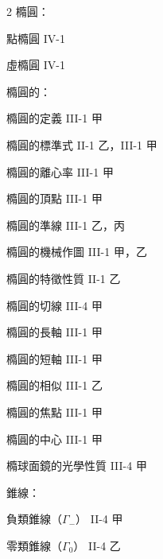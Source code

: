 \begin{multicols}{2}
\noindent 橢圓：\par
\noindent\hspace*{1.5em} 點橢圓 \hfill IV-1\par
\noindent\hspace*{1.5em} 虛橢圓 \hfill IV-1\par
\noindent 橢圓的：\par
\noindent\hspace*{1.5em} 橢圓的定義 \hfill III-1 甲\par
\noindent\hspace*{1.5em} 橢圓的標準式 \hfill II-1 乙，III-1 甲\par
\noindent\hspace*{1.5em} 橢圓的離心率 \hfill III-1 甲\par
\noindent\hspace*{1.5em} 橢圓的頂點 \hfill III-1 甲\par
\noindent\hspace*{1.5em} 橢圓的準線 \hfill III-1 乙，丙\par
\noindent\hspace*{1.5em} 橢圓的機械作圖 \hfill III-1 甲，乙\par
\noindent\hspace*{1.5em} 橢圓的特徵性質 \hfill II-1 乙\par
\noindent\hspace*{1.5em} 橢圓的切線 \hfill III-4 甲\par
\noindent\hspace*{1.5em} 橢圓的長軸 \hfill III-1 甲\par
\noindent\hspace*{1.5em} 橢圓的短軸 \hfill III-1 甲\par
\noindent\hspace*{1.5em} 橢圓的相似 \hfill III-1 乙\par
\noindent\hspace*{1.5em} 橢圓的焦點 \hfill III-1 甲\par
\noindent\hspace*{1.5em} 橢圓的中心 \hfill III-1 甲\par
\noindent 橢球面鏡的光學性質 \hfill III-4 甲\par
\noindent 錐線：\par
\noindent\hspace*{1.5em} 負類錐線（$\Gamma_-$） \hfill II-4 甲\par
\noindent\hspace*{1.5em} 零類錐線（$\Gamma_0$） \hfill II-4 乙\par

\end{multicols}
